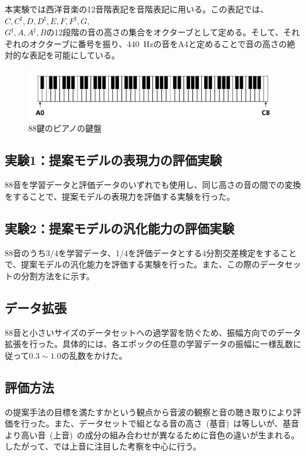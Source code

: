 本実験では西洋音楽の12音階表記を音階表記に用いる。この表記では、$C,C^{\sharp},D,D^{\sharp},E,F,F^{\sharp},G,$\\
$G^{\sharp},A,A^{\sharp},B$の12段階の音の高さの集合をオクターブとして定める。そして、それぞれのオクターブに番号を振り、440~Hzの音をA4と定めることで音の高さの絶対的な表記を可能にしている。

\begin{figure}[b]
\centering
\includegraphics[width=0.8\columnwidth]{figure/piano.png}
\caption{88鍵のピアノの鍵盤}
\label{fig:piano}
\end{figure}

\subsection{実験1：提案モデルの表現力の評価実験}

88音を学習データと評価データのいずれでも使用し、同じ高さの音の間での変換をすることで、提案モデルの表現力を評価する実験を行った。

\subsection{実験2：提案モデルの汎化能力の評価実験}

88音のうち3/4を学習データ、1/4を評価データとする4分割交差検定をすることで、提案モデルの汎化能力を評価する実験を行った。また、この際のデータセットの分割方法をに示す。

\subsection{データ拡張}

88音と小さいサイズのデータセットへの過学習を防ぐため、振幅方向でのデータ拡張を行った。具体的には、各エポックの任意の学習データの振幅に一様乱数に従って$0.3\sim1.0$の乱数をかけた。

\subsection{評価方法}

の提案手法の目標を満たすかという観点から音波の観察と音の聴き取りにより評価を行った。また、データセットで組となる音の高さ~(基音)~は等しいが、基音より高い音~(上音)~の成分の組み合わせが異なるために音色の違いが生まれる。したがって、では上音に注目した考察を中心に行う。

